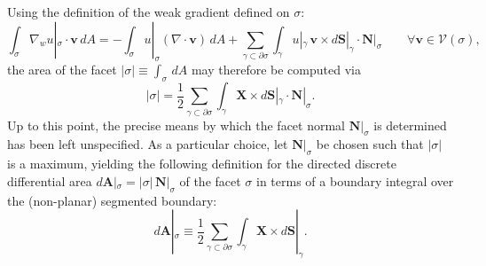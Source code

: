 \documentclass[10pt,a4paper]{article}
\begin{document}
Using the definition of the weak gradient defined on $\sigma$:
\begin{equation}
  \int_{\sigma} \nabla_w u |_{\sigma} \cdot \mathbf{v} \, dA = - \int_{\sigma} u |_{\sigma} (\nabla \cdot \mathbf{v}) \, dA + \sum_{\gamma \subset \partial \sigma} \int_{\gamma} u |_{\gamma} \, \mathbf{v} \times d \mathbf{S} |_{\gamma} \cdot \mathbf{N} |_{\sigma} \qquad \forall \mathbf{v} \in \mathcal{V} (\sigma),
\end{equation}
the area of the facet $| \sigma | \equiv \int_\sigma \, dA$ may therefore be computed via
\begin{equation}
	| \sigma | = \frac{1}{2} \sum_{\gamma \subset \partial \sigma} \int_{\gamma} \mathbf{X} \times d\mathbf{S} |_{\gamma} \cdot \mathbf{N} |_{\sigma}.
\end{equation}
Up to this point, the precise means by which the facet normal $\mathbf{N} |_{\sigma}$ is determined has been left unspecified. As a particular choice, let $\mathbf{N} |_{\sigma}$ be chosen such that $| \sigma |$ is a maximum, yielding the following definition for the directed discrete differential area $d\mathbf{A} |_{\sigma} = |\sigma| \, \mathbf{N} |_{\sigma}$ of the facet $\sigma$ in terms of a boundary integral over the (non-planar) segmented boundary:
\begin{equation}
	d\mathbf{A} |_{\sigma} \equiv \frac{1}{2} \sum_{\gamma \subset \partial \sigma} \int_{\gamma} \mathbf{X} \times d\mathbf{S} |_{\gamma}.
\end{equation}
\end{document}

